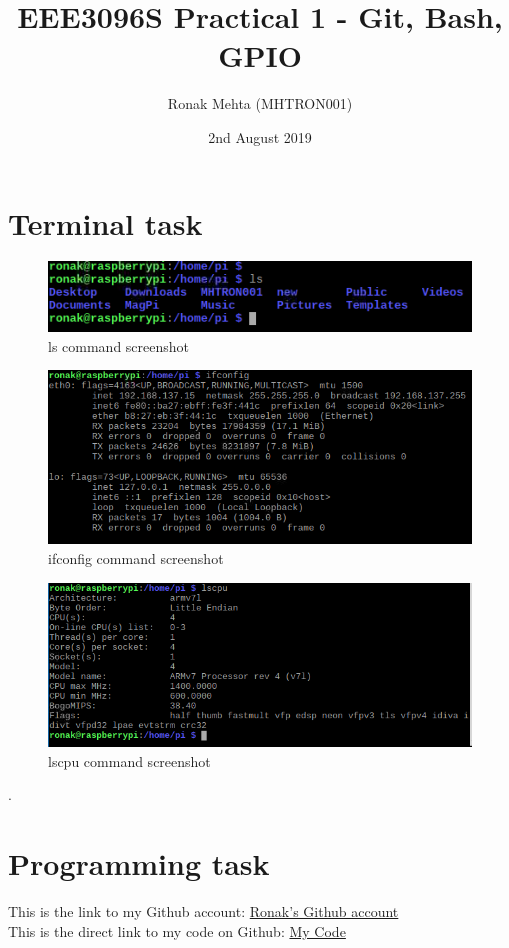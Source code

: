 \documentclass[12pt]{extarticle}
\title{EEE3096S Practical 1 - Git, Bash, GPIO}
\author{Ronak Mehta (MHTRON001)}
\date{2nd August 2019}
\begin{document}
\maketitle

\section{Terminal task}
\begin{figure}[htp]
    \centering
    \includegraphics[width=15cm]{ls.PNG}
    \caption{ls command screenshot}
    \label{fig:ls}
\end{figure}

\begin{figure}[htp]
    \centering
    \includegraphics[width=15cm]{eth0.PNG}
    \caption{ifconfig command screenshot}
    \label{fig:eth0}
\end{figure}

\begin{figure}[htp]
    \centering
    \includegraphics[width=15cm]{lscpu.PNG}
    \caption{lscpu command screenshot}
    \label{fig:lscpu}
\end{figure}
\vspace{5mm}
.
\section{Programming task}
This is the link to my Github account: \href{https://github.com/MHTRON001/ronak_mehta}{Ronak's Github account}\\
This is the direct link to my code on Github: \href{https://github.com/MHTRON001/ronak_mehta/blob/master/prac1.py}{My Code}
\end{document}

